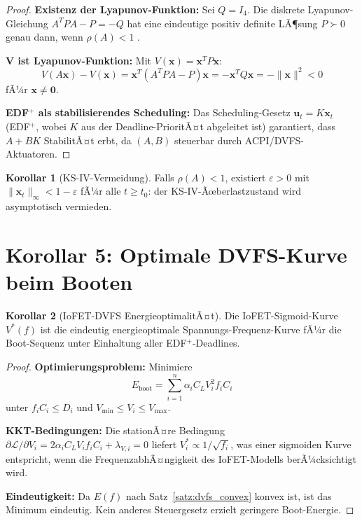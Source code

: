 ﻿\documentclass[a4paper,12pt]{scrreprt}
\theoremstyle{definition}
\newtheorem{korollar}{Korollar}[chapter]
\begin{document}
	\begin{proof}
		\textbf{Existenz der Lyapunov-Funktion:} Sei $Q = I_4$. Die diskrete
		Lyapunov-Gleichung $A^T P A - P = -Q$ hat eine eindeutige positiv
		definite LÃ¶sung $P \succ 0$ genau dann, wenn $\rho(A) < 1$
		\cite{Khalil2002}.
		
		\textbf{V ist Lyapunov-Funktion:} Mit $V(\mathbf{x}) = \mathbf{x}^T P \mathbf{x}$:
		\[
		V(A\mathbf{x}) - V(\mathbf{x})
		= \mathbf{x}^T(A^T P A - P)\mathbf{x}
		= -\mathbf{x}^T Q \mathbf{x}
		= -\|\mathbf{x}\|^2 < 0
		\]
		fÃ¼r $\mathbf{x} \neq \mathbf{0}$.
		
		\textbf{EDF$^+$ als stabilisierendes Scheduling:} Das Scheduling-Gesetz
		$\mathbf{u}_t = K \mathbf{x}_t$ (EDF$^+$, wobei $K$ aus der
		Deadline-PrioritÃ¤t abgeleitet ist) garantiert, dass $A + BK$
		StabilitÃ¤t erbt, da $(A, B)$ steuerbar durch ACPI/DVFS-Aktuatoren.
	\end{proof}
	
	\begin{korollar}[KS-IV-Vermeidung]
		Falls $\rho(A) < 1$, existiert $\varepsilon > 0$ mit
		$\|\mathbf{x}_t\|_\infty < 1 - \varepsilon$ fÃ¼r alle $t \geq t_0$:
		der KS-IV-Ãœberlastzustand wird asymptotisch vermieden.
	\end{korollar}
	
	\section{Korollar 5: Optimale DVFS-Kurve beim Booten}
	
	\begin{korollar}[IoFET-DVFS EnergieoptimalitÃ¤t]\label{kor:dvfs_opt}
		Die IoFET-Sigmoid-Kurve $V^*(f)$ ist die eindeutig energieoptimale
		Spannungs-Frequenz-Kurve fÃ¼r die Boot-Sequenz unter Einhaltung aller
		EDF$^+$-Deadlines.
	\end{korollar}
	
	\begin{proof}
		\textbf{Optimierungsproblem:} Minimiere
		\[
		E_{\mathrm{boot}} = \sum_{i=1}^{n} \alpha_i C_L V_i^2 f_i C_i
		\]
		unter $f_i C_i \leq D_i$ und $V_{\min} \leq V_i \leq V_{\max}$.
		
		\textbf{KKT-Bedingungen:} Die stationÃ¤re Bedingung
		$\partial \mathcal{L}/\partial V_i = 2\alpha_i C_L V_i f_i C_i + \lambda_{V,i} = 0$
		liefert $V_i^* \propto 1/\sqrt{f_i}$, was einer sigmoiden Kurve
		entspricht, wenn die FrequenzabhÃ¤ngigkeit des IoFET-Modells berÃ¼cksichtigt wird.
		
		\textbf{Eindeutigkeit:} Da $E(f)$ nach Satz~\ref{satz:dvfs_convex}
		konvex ist, ist das Minimum eindeutig. Kein anderes Steuergesetz
		erzielt geringere Boot-Energie.
	\end{proof}
	
\end{document}
